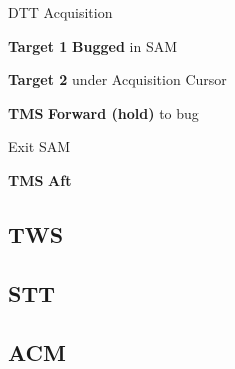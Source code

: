 \begin{tableitemize}
{    DTT Acquisition

    \begin{subenumerate}
        \item \textbf{Target 1} \dotfill \textbf{Bugged} in SAM
        \item \textbf{Target 2} \dotfill under Acquisition Cursor
        \item \textbf{TMS} \dotfill \textbf{Forward (hold)} to bug
    \end{subenumerate}
    
    Exit SAM 
    
    \begin{subenumerate}
        \item \textbf{TMS} \dotfill \textbf{Aft}
    \end{subenumerate}}
\end{tableitemize}



\subsection{TWS}

\subsection{STT}

\subsection{ACM}

